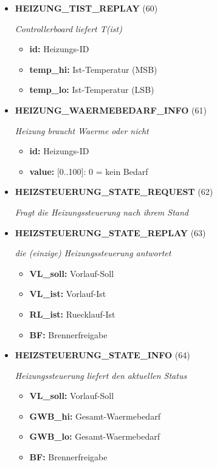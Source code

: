 \begin{itemize}
\item \textbf{HEIZUNG\_TIST\_REPLAY} (60)

\textit{Controllerboard liefert T(ist)}

\small
\begin{itemize}
		
\item \textbf{id:} Heizungs-ID
\item \textbf{temp\_hi:} Ist-Temperatur (MSB)
\item \textbf{temp\_lo:} Ist-Temperatur (LSB)
\end{itemize}
\normalsize
	
\item \textbf{HEIZUNG\_WAERMEBEDARF\_INFO} (61)

\textit{Heizung braucht Waerme oder nicht}

\small
\begin{itemize}
		
\item \textbf{id:} Heizungs-ID
\item \textbf{value:} [0..100]: 0 = kein Bedarf
\end{itemize}
\normalsize
	
\item \textbf{HEIZSTEUERUNG\_STATE\_REQUEST} (62)

\textit{Fragt die Heizungssteuerung nach ihrem Stand}

\item \textbf{HEIZSTEUERUNG\_STATE\_REPLAY} (63)

\textit{die (einzige) Heizungssteuerung antwortet}

\small
\begin{itemize}
		
\item \textbf{VL\_soll:} Vorlauf-Soll
\item \textbf{VL\_ist:} Vorlauf-Ist
\item \textbf{RL\_ist:} Ruecklauf-Ist
\item \textbf{BF:} Brennerfreigabe
\end{itemize}
\normalsize
	
\item \textbf{HEIZSTEUERUNG\_STATE\_INFO} (64)

\textit{Heizungssteuerung liefert den aktuellen Status}

\small
\begin{itemize}
		
\item \textbf{VL\_soll:} Vorlauf-Soll
\item \textbf{GWB\_hi:} Gesamt-Waermebedarf
\item \textbf{GWB\_lo:} Gesamt-Waermebedarf
\item \textbf{BF:} Brennerfreigabe
\end{itemize}
\normalsize
	

\end{itemize}
